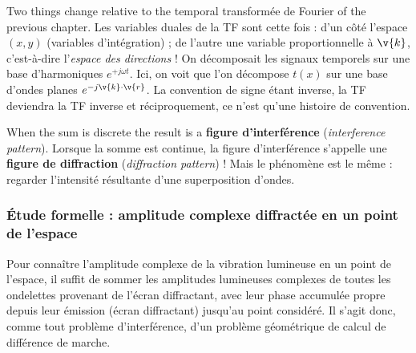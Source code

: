 \begin{remark}
  Two things change relative to the temporal transformée de Fourier of the
  previous chapter. Les variables duales de la TF sont cette fois : d'un côté
  l'espace $(x,y)$ (variables d'intégration) ; de l'autre une variable
  proportionnelle à $\v{k}$, c'est-à-dire l'\emph{espace des directions} ! On
  décomposait les signaux temporels sur une base d'harmoniques
  $e^{+j\omega t}$. Ici, on voit que l'on décompose $t(x)$ sur une base d'ondes
  planes $e^{-j\v{k}\cdot\v{r}}$. La convention de signe étant inverse, la TF
  deviendra la TF inverse et réciproquement, ce n'est qu'une histoire de
  convention.
\end{remark}

\begin{notation}
  When the sum is discrete the result is a \textbf{figure d'interférence}
  (\textit{interference pattern}). Lorsque la somme est continue, la figure
  d'interférence s'appelle une \textbf{figure de diffraction}
  (\textit{diffraction pattern}) ! Mais le phénomène est le même : regarder
  l'intensité résultante d'une superposition d'ondes.
\end{notation}

\subsubsection{Étude formelle : amplitude complexe diffractée en un point de l'espace}
Pour connaître l'amplitude complexe de la vibration lumineuse en un point de
l'espace, il suffit de sommer les amplitudes lumineuses complexes de toutes les
ondelettes provenant de l'écran diffractant, avec leur phase accumulée propre
depuis leur émission (écran diffractant) jusqu'au point considéré. Il s'agit
donc, comme tout problème d'interférence, d'un problème géométrique de calcul de
différence de marche.

\begin{figure}[h!]
  \centering
\end{figure}

